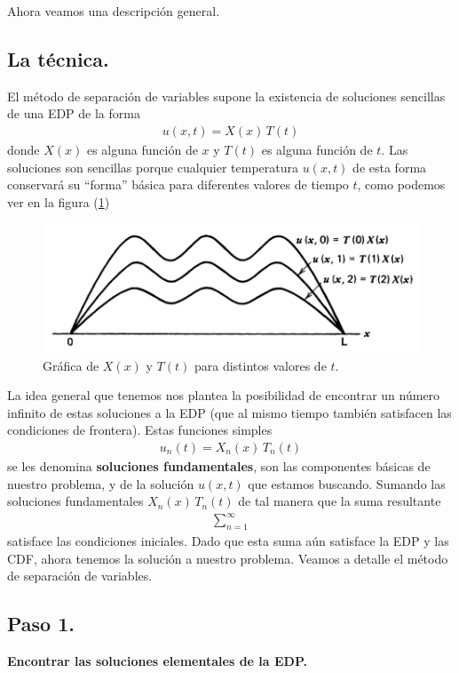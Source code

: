 Ahora veamos una descripción general.
\subsection{La técnica.}
El método de separación de variables supone la existencia de soluciones sencillas de una EDP de la forma
\begin{align*}
u(x, t) =  X(x) \, T(t)
\end{align*}
donde $X (x)$ es alguna función de $x$ y $T (t)$ es alguna función de $t$. Las soluciones son sencillas porque cualquier temperatura $u (x, t)$ de esta forma conservará su \enquote{forma} básica para diferentes valores de tiempo $t$, como podemos ver en la figura (\ref{fig:figura_separacion_variables_01})
\begin{figure}[H]
    \centering
    \includegraphics[scale=0.3]{Imagenes/Separacion_Variables_01.png}
    \caption{Gráfica de $X(x)$ y $T(t)$ para distintos valores de $t$.}
    \label{fig:figura_separacion_variables_01}
\end{figure}
La idea general que tenemos nos plantea la posibilidad de encontrar un número infinito de estas soluciones a la EDP (que al mismo tiempo también satisfacen las condiciones de frontera). Estas funciones simples
\begin{align*}
u_{n} (t) = X_{n} (x) \, T_{n}(t)
\end{align*}
se les denomina \textbf{soluciones fundamentales}, son las componentes básicas de nuestro problema, y de la solución $u (x, t)$ que estamos buscando. Sumando las soluciones fundamentales $X_{n}(x) \, T_{n} (t)$ de tal manera que la suma resultante
\begin{align*}
\sum_{n=1}^{\infty} %
\end{align*}
satisface las condiciones iniciales. Dado que esta suma aún satisface la EDP y las CDF, ahora tenemos la solución a nuestro problema. Veamos a detalle el método de separación de variables.
\subsection{Paso 1.}
\textbf{Encontrar las soluciones elementales de la EDP.}

